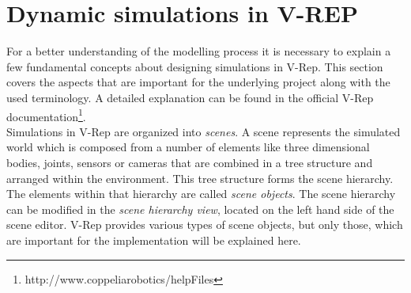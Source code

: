 
\section{Dynamic simulations in V-REP}
\label{sec:vrep_intro}

For a better understanding of the modelling process it is necessary to explain a few fundamental concepts about designing simulations in V-Rep. This section covers the aspects that are important for the underlying project along with the used terminology. A detailed explanation can be found in the official V-Rep documentation\footnote{http://www.coppeliarobotics/helpFiles}. \\

Simulations in V-Rep are organized into \emph{scenes}. A scene represents the simulated world which is composed from a number of elements like three dimensional bodies, joints, sensors or cameras that are combined in a tree structure and arranged within the environment. This tree structure forms the scene hierarchy. The elements within that hierarchy are called \emph{scene objects}. The scene hierarchy can be modified in the \emph{scene hierarchy view}, located on the left hand side of the scene editor. V-Rep provides various types of scene objects, but only those, which are important for the implementation will be explained here.

